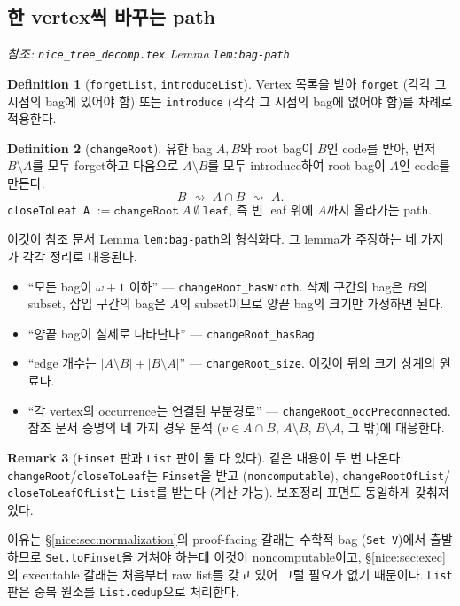 \documentclass[11pt]{article}
\theoremstyle{definition}
\newtheorem{definition}{Definition}[section]
\newtheorem{remark}[definition]{Remark}
\theoremstyle{plain}
\newcommand{\lean}[1]{\texttt{#1}}
\newcommand{\leanfile}[1]{\texttt{#1}}
\begin{document}
\subsection{한 vertex씩 바꾸는 path}

\emph{참조: \leanfile{nice\_tree\_decomp.tex} Lemma \lean{lem:bag-path}}

\begin{definition}[\lean{forgetList}, \lean{introduceList}]
\label{nice:def:forgetintroducelist}
Vertex 목록을 받아 \lean{forget} (각각 그 시점의 bag에 있어야 함) 또는
\lean{introduce} (각각 그 시점의 bag에 없어야 함)를 차례로 적용한다.
\end{definition}

\begin{definition}[\lean{changeRoot}]
\label{nice:def:changeroot}
유한 bag $A, B$와 root bag이 $B$인 code를 받아, 먼저 $B \setminus A$를 모두
forget하고 다음으로 $A \setminus B$를 모두 introduce하여 root bag이 $A$인
code를 만든다.
\[
  B \;\rightsquigarrow\; A \cap B \;\rightsquigarrow\; A.
\]
\lean{closeToLeaf A} $:= \lean{changeRoot}\ A\ \emptyset\ \lean{leaf}$,
즉 빈 leaf 위에 $A$까지 올라가는 path.
\end{definition}

이것이 참조 문서 Lemma \lean{lem:bag-path}의 형식화다. 그 lemma가 주장하는
네 가지가 각각 정리로 대응된다.

\begin{itemize}
  \item ``모든 bag이 $\omega+1$ 이하'' --- \lean{changeRoot\_hasWidth}.
    삭제 구간의 bag은 $B$의 subset, 삽입 구간의 bag은 $A$의 subset이므로
    양끝 bag의 크기만 가정하면 된다.
  \item ``양끝 bag이 실제로 나타난다'' --- \lean{changeRoot\_hasBag}.
  \item ``edge 개수는 $|A \setminus B| + |B \setminus A|$'' ---
    \lean{changeRoot\_size}. 이것이 뒤의 크기 상계의 원료다.
  \item ``각 vertex의 occurrence는 연결된 부분경로'' ---
    \lean{changeRoot\_occPreconnected}. 참조 문서 증명의 네 가지 경우 분석
    ($v \in A \cap B$, $A \setminus B$, $B \setminus A$, 그 밖)에 대응한다.
\end{itemize}

\begin{remark}[\lean{Finset} 판과 \lean{List} 판이 둘 다 있다]
\label{nice:rem:twopresentations}
같은 내용이 두 번 나온다: \lean{changeRoot}/\lean{closeToLeaf}는
\lean{Finset}을 받고 (\lean{noncomputable}), \lean{changeRootOfList}/
\lean{closeToLeafOfList}는 \lean{List}를 받는다 (계산 가능).
보조정리 표면도 동일하게 갖춰져 있다.

이유는 \S\ref{nice:sec:normalization}의 proof-facing 갈래는 수학적 bag
(\lean{Set V})에서 출발하므로 \lean{Set.toFinset}을 거쳐야 하는데 이것이
noncomputable이고, \S\ref{nice:sec:exec}의 executable 갈래는 처음부터 raw
list를 갖고 있어 그럴 필요가 없기 때문이다. \lean{List} 판은 중복 원소를
\lean{List.dedup}으로 처리한다.
\end{remark}
\end{document}
